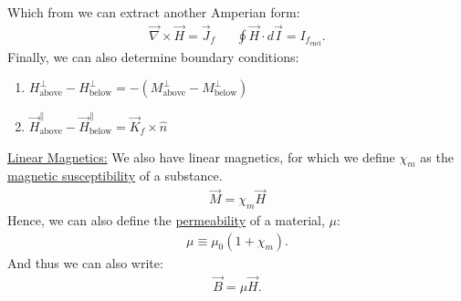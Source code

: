 \documentclass{article}
\newcommand{\sheader}[1]{\underline{#1:}}
\begin{document}
Which from we can extract another Amperian form:
\begin{align*}
    \vec{\nabla} \times \vec{H} = \vec{J}_f && \oint \vec{H} \cdot d\vec{I} = I_{f_\textrm{encl}}.
\end{align*}
Finally, we can also determine boundary conditions:
\begin{enumerate}[label=(\alph*)]
    \item $H^\perp_\textrm{above} - H_\textrm{below}^\perp = - (M^\perp_\textrm{above} - M^\perp_\textrm{below})$
    \item $\vec{H}_\textrm{above}^\parallel - \vec{H}_\textrm{below}^\parallel = \vec{K}_f \times \hat{n}$
\end{enumerate}
\sheader{Linear Magnetics} We also have linear magnetics, for which we define $\chi_m$ as the 
\underline{magnetic susceptibility} of a substance. 
\begin{align*}
    \vec{M} = \chi_m\vec{H}
\end{align*}
Hence, we can also define the \underline{permeability} of a material, $\mu$:
\begin{align*}
    \mu \equiv \mu_0(1 + \chi_m).
\end{align*}
And thus we can also write:
\begin{align*}
    \vec{B} = \mu \vec{H}.
\end{align*}

\pagebreak
\end{document}
